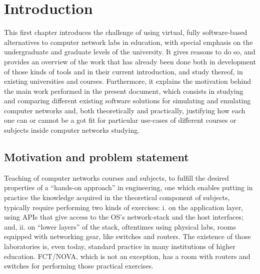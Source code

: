 
\chapter{Introduction}
\label{ch:introduction}

This first chapter introduces the challenge of using virtual, fully software-based alternatives to computer network labs in education, with special emphasis on the undergraduate and graduate levels of the university. %
It gives reasons to do so, and provides an overview of the work that has already been done both in development of those kinds of tools and in their current introduction, and study thereof, in existing universities and courses.
Furthermore, it explains the motivation behind the main work performed in the present document, which consists in studying and comparing different existing software solutions for simulating and emulating computer networks and, both theoretically and practically, justifying how each one can or cannot be a got fit for particular use-cases of different courses or subjects inside computer networks studying.


\section{Motivation and problem statement}
\label{sec:motivation}

Teaching of computer networks courses and subjects, to fulfill the desired properties of a ``hands-on approach'' in engineering, one which enables putting in practice the knowledge acquired in the theoretical component of subjects, typically require performing two kinds of exercises: i. on the application layer, using APIs that give access to the OS's network-stack and the host interfaces; and, ii. on ``lower layers'' of the stack, oftentimes using physical labs, rooms equipped with networking gear, like switches and routers. %
The existence of those laboratories is, even today, standard practice in many institutions of higher education. FCT/NOVA, which is not an exception, has a room with routers and switches for performing those practical exercises. %

